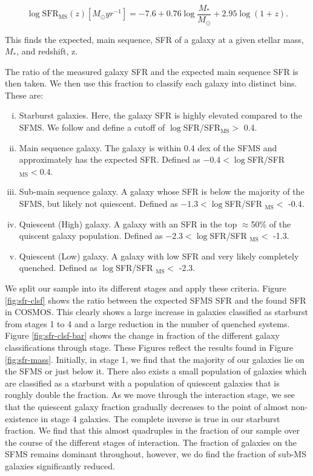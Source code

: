 \documentclass[fleqn,usenatbib]{mnras}
\begin{document}
\begin{equation}
    \log \text{SFR}_{\text{MS}}(z)[M_\odot yr^{-1}] = -7.6 + 0.76\log\frac{M_*}{M_\odot} + 2.95\log(1+z).
\end{equation}

\noindent This finds the expected, main sequence, SFR of a galaxy at a given stellar mass, $M_*$, and redshift, z.

The ratio of the measured galaxy SFR and the expected main sequence SFR is then taken. We then use this fraction to classify each galaxy into distinct bins. These are:

\begin{enumerate}[(i)]
    \item Starburst galaxies. Here, the galaxy SFR is highly elevated compared to the SFMS. We follow \citet{2019MNRAS.484.4360A} and define a cutoff of $\log$SFR/SFR$_{\text{MS}} >$ 0.4.
    \item Main sequence galaxy. The galaxy is within 0.4 dex of the SFMS and approximately has the expected SFR. Defined as $-0.4 < \log$SFR/SFR$_{\text{MS}} < 0.4$.
    \item Sub-main sequence galaxy. A galaxy whose SFR is below the majority of the SFMS, but likely not quiescent. Defined as $-1.3 < \log$SFR/SFR $_{\text{MS}} < $ -0.4.
    \item Quiescent (High) galaxy. A galaxy with an SFR in the top $\approx$50\% of the quiscent galaxy population. Defined as $-2.3 < \log$SFR/SFR $_{\text{MS}} <$ -1.3.
    \item Quiescent (Low) galaxy. A galaxy with low SFR and very likely completely quenched. Defined as $\log$SFR/SFR $_{\text{MS}} <$ -2.3.
\end{enumerate}

\noindent We split our sample into its different stages and apply these criteria. Figure \ref{fig:sfr-clsf} shows the ratio between the expected SFMS SFR and the found SFR in COSMOS. This clearly shows a large increase in galaxies classified as starburst from stages 1 to 4 and a large reduction in the number of quenched systems. Figure \ref{fig:sfr-clsf-bar} shows the change in fraction of the different galaxy classifications through stage. These Figures reflect the results found in Figure \ref{fig:sfr-mass}. Initially, in stage 1, we find that the majority of our galaxies lie on the SFMS or just below it. There also exists a small population of galaxies which are classified as a starburst with a population of quiescent galaxies that is roughly double the fraction. As we move through the interaction stage, we see that the quiescent galaxy fraction gradually decreases to the point of almost non-existence in stage 4 galaxies. The complete inverse is true in our starburst fraction. We find that this almost quadruples in the fraction of our sample over the course of the different stages of interaction. The fraction of galaxies on the SFMS remains dominant throughout, however, we do find the fraction of sub-MS galaxies significantly reduced.
\end{document}
